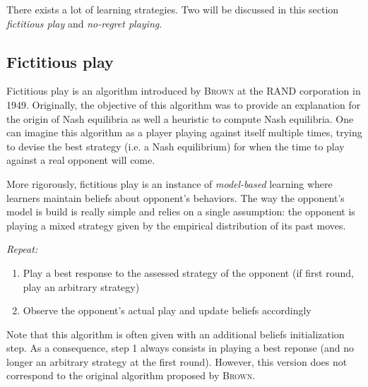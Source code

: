 There exists a lot of learning strategies. Two will be discussed in this
section \emph{fictitious play} and \emph{no-regret playing}.

\subsection{Fictitious play}
Fictitious play is an algorithm introduced by \textsc{Brown} at the RAND
corporation in 1949. Originally, the objective of this algorithm was to
provide an explanation for the origin of Nash equilibria as well a heuristic
to compute Nash equilibria. One can imagine this algorithm as a player
playing against itself multiple times, trying to devise the best strategy
(i.e. a Nash equilibrium) for when the time to play against a real opponent
will come.

More rigorously, fictitious play is an instance of \textit{model-based}
learning where learners maintain beliefs about opponent's behaviors. The
way the opponent's model is build is really simple and relies on a single
assumption: the opponent is playing a mixed strategy given by the empirical
distribution of its past moves.

\begin{procedure}
    \emph{Repeat:}
    \begin{enumerate}
        \item Play a best response to the assessed strategy of the opponent (if
        first round, play an arbitrary strategy)
	    \item Observe the opponent's actual play and update beliefs accordingly
    \end{enumerate}
    \label{chap9:fictplayproc}
\end{procedure}

Note that this algorithm is often given with an additional beliefs initialization
step. As a consequence, step 1 always consists in playing a best reponse (and
no longer an arbitrary strategy at the first round). However, this version does
not correspond to the original algorithm proposed by \textsc{Brown}.

